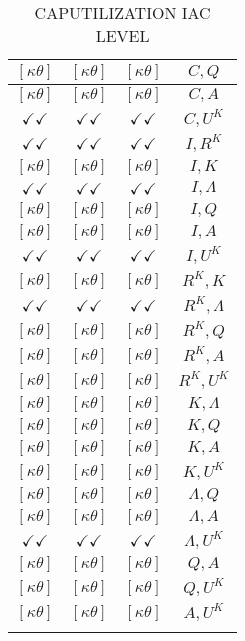 \documentclass[a4paper,10pt]{article}
\begin{document}
\begin{longtable}{|c|c|c|c|}
\hline
$[\kappa \theta ]$ & $[\kappa \theta ]$ & $[\kappa \theta ]$ & ${C},{Q}$ \\
\hline
$[\kappa \theta ]$ & $[\kappa \theta ]$ & $[\kappa \theta ]$ & ${C},{A}$ \\
\hline
$\checkmark\checkmark$ & $\checkmark\checkmark$ & $\checkmark\checkmark$ & ${C},{U^K}$ \\
\hline
$\checkmark\checkmark$ & $\checkmark\checkmark$ & $\checkmark\checkmark$ & ${I},{R^{K}}$ \\
\hline
$[\kappa \theta ]$ & $[\kappa \theta ]$ & $[\kappa \theta ]$ & ${I},{K}$ \\
\hline
$\checkmark\checkmark$ & $\checkmark\checkmark$ & $\checkmark\checkmark$ & ${I},{\Lambda}$ \\
\hline
$[\kappa \theta ]$ & $[\kappa \theta ]$ & $[\kappa \theta ]$ & ${I},{Q}$ \\
\hline
$[\kappa \theta ]$ & $[\kappa \theta ]$ & $[\kappa \theta ]$ & ${I},{A}$ \\
\hline
$\checkmark\checkmark$ & $\checkmark\checkmark$ & $\checkmark\checkmark$ & ${I},{U^K}$ \\
\hline
$[\kappa \theta ]$ & $[\kappa \theta ]$ & $[\kappa \theta ]$ & ${R^{K}},{K}$ \\
\hline
$\checkmark\checkmark$ & $\checkmark\checkmark$ & $\checkmark\checkmark$ & ${R^{K}},{\Lambda}$ \\
\hline
$[\kappa \theta ]$ & $[\kappa \theta ]$ & $[\kappa \theta ]$ & ${R^{K}},{Q}$ \\
\hline
$[\kappa \theta ]$ & $[\kappa \theta ]$ & $[\kappa \theta ]$ & ${R^{K}},{A}$ \\
\hline
$[\kappa \theta ]$ & $[\kappa \theta ]$ & $[\kappa \theta ]$ & ${R^{K}},{U^K}$ \\
\hline
$[\kappa \theta ]$ & $[\kappa \theta ]$ & $[\kappa \theta ]$ & ${K},{\Lambda}$ \\
\hline
$[\kappa \theta ]$ & $[\kappa \theta ]$ & $[\kappa \theta ]$ & ${K},{Q}$ \\
\hline
$[\kappa \theta ]$ & $[\kappa \theta ]$ & $[\kappa \theta ]$ & ${K},{A}$ \\
\hline
$[\kappa \theta ]$ & $[\kappa \theta ]$ & $[\kappa \theta ]$ & ${K},{U^K}$ \\
\hline
$[\kappa \theta ]$ & $[\kappa \theta ]$ & $[\kappa \theta ]$ & ${\Lambda},{Q}$ \\
\hline
$[\kappa \theta ]$ & $[\kappa \theta ]$ & $[\kappa \theta ]$ & ${\Lambda},{A}$ \\
\hline
$\checkmark\checkmark$ & $\checkmark\checkmark$ & $\checkmark\checkmark$ & ${\Lambda},{U^K}$ \\
\hline
$[\kappa \theta ]$ & $[\kappa \theta ]$ & $[\kappa \theta ]$ & ${Q},{A}$ \\
\hline
$[\kappa \theta ]$ & $[\kappa \theta ]$ & $[\kappa \theta ]$ & ${Q},{U^K}$ \\
\hline
$[\kappa \theta ]$ & $[\kappa \theta ]$ & $[\kappa \theta ]$ & ${A},{U^K}$ \\
\hline
\caption{CAPUTILIZATION IAC LEVEL}
\label{table:MyTableLabel}
\end{longtable}
\end{document}

